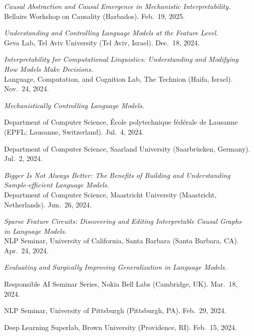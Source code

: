 \documentclass[10pt]{article}
\newcommand{\halfblankline}{\quad\vspace{-0.5\baselineskip}\pagebreak[3]}
\begin{document}
	\halfblankline
	
	\emph{Causal Abstraction and Causal Emergence in Mechanistic Interpretability.}\\
	Bellairs Workshop on Causality (Barbados). Feb.\ 19, 2025.

	\halfblankline

	\emph{Understanding and Controlling Language Models at the Feature Level.}\\
	Geva Lab, Tel Aviv University (Tel Aviv, Israel). Dec.\ 18, 2024.

	\halfblankline

	\emph{Interpretability for Computational Linguistics: Understanding and Modifying\\How Models Make Decisions.}\\
	Language, Computation, and Cognition Lab, The Technion (Haifa, Israel). Nov.\ 24, 2024.

	\halfblankline

	\emph{Mechanistically Controlling Language Models.}
	\begin{innerlist}
	\item Department of Computer Science, École polytechnique fédérale de Lausanne (EPFL; Lausanne, Switzerland). Jul.\ 4, 2024.
	\item Department of Computer Science, Saarland University (Saarbrücken, Germany). Jul.\ 2, 2024.
	\end{innerlist}
	
	\halfblankline
	
	\emph{Bigger Is Not Always Better: The Benefits of Building and Understanding\\Sample-efficient Language Models.}\\Department of Computer Science, Maastricht University (Maastricht, Netherlands). Jun.\ 26, 2024.
	
	\halfblankline

	\emph{Sparse Feature Circuits: Discovering and Editing Interpretable Causal Graphs\\in Language Models.}\\NLP Seminar, University of California, Santa Barbara (Santa Barbara, CA). Apr.\ 24, 2024.

	\halfblankline

	\emph{Evaluating and Surgically Improving Generalization in Language Models.}
	\begin{innerlist}
	\item Responsible AI Seminar Series, Nokia Bell Labs (Cambridge, UK). Mar.\ 18, 2024.
	\item NLP Seminar, University of Pittsburgh (Pittsburgh, PA). Feb.\ 29, 2024.
	\item Deep Learning Superlab, Brown University (Providence, RI). Feb.\ 15, 2024.
	\end{innerlist}
\end{document}
